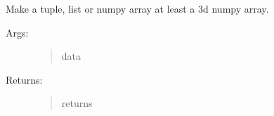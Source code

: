 \documentclass[letterpaper,10pt,english]{sphinxmanual}
\begin{document}
\begin{fulllineitems}
\label{\detokenize{utils:luxpy.utils.helpers.np3d}}
Make a tuple, list or numpy array at least a 3d numpy array.
\begin{description}
\item[{Args:}] \leavevmode\begin{quote}\begin{description}
\item[{data}] \leavevmode
{}

\end{description}\end{quote}

\item[{Returns:}] \leavevmode\begin{quote}\begin{description}
\item[{returns}] \leavevmode
{}

\end{description}\end{quote}

\end{description}

\end{fulllineitems}

\end{document}
